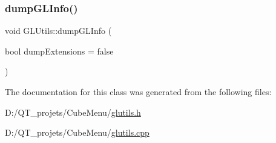 \hypertarget{class_g_l_utils_a065718e951492c03747f34ec08f71d64}{}\label{class_g_l_utils_a065718e951492c03747f34ec08f71d64} 
\subsubsection{\texorpdfstring{dump\+G\+L\+Info()}{dumpGLInfo()}}
{\footnotesize\ttfamily void G\+L\+Utils\+::dump\+G\+L\+Info (\begin{DoxyParamCaption}\item[{bool}]{dump\+Extensions = {\ttfamily false} }\end{DoxyParamCaption})\hspace{0.3cm}{\ttfamily [static]}}



The documentation for this class was generated from the following files\+:\begin{DoxyCompactItemize}
\item 
D\+:/\+Q\+T\+\_\+projets/\+Cube\+Menu/\hyperlink{glutils_8h}{glutils.\+h}\item 
D\+:/\+Q\+T\+\_\+projets/\+Cube\+Menu/\hyperlink{glutils_8cpp}{glutils.\+cpp}\end{DoxyCompactItemize}
